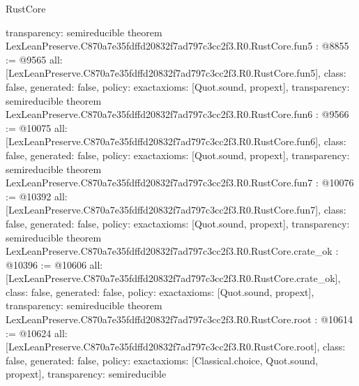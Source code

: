 \begin{lexlean}{RustCore}
\begin{coremodule}
{  transparency: semireducible
}
theorem LexLeanPreserve.C870a7e35fdffd20832f7ad797c3cc2f3.R0.RustCore.fun5 : @8855 := @9565 {
  all: [LexLeanPreserve.C870a7e35fdffd20832f7ad797c3cc2f3.R0.RustCore.fun5],
  class: false,
  generated: false,
  policy: exact{axioms: [Quot.sound, propext]},
  transparency: semireducible
}
theorem LexLeanPreserve.C870a7e35fdffd20832f7ad797c3cc2f3.R0.RustCore.fun6 : @9566 := @10075 {
  all: [LexLeanPreserve.C870a7e35fdffd20832f7ad797c3cc2f3.R0.RustCore.fun6],
  class: false,
  generated: false,
  policy: exact{axioms: [Quot.sound, propext]},
  transparency: semireducible
}
theorem LexLeanPreserve.C870a7e35fdffd20832f7ad797c3cc2f3.R0.RustCore.fun7 : @10076 := @10392 {
  all: [LexLeanPreserve.C870a7e35fdffd20832f7ad797c3cc2f3.R0.RustCore.fun7],
  class: false,
  generated: false,
  policy: exact{axioms: [Quot.sound, propext]},
  transparency: semireducible
}
theorem LexLeanPreserve.C870a7e35fdffd20832f7ad797c3cc2f3.R0.RustCore.crate_ok : @10396 := @10606 {
  all: [LexLeanPreserve.C870a7e35fdffd20832f7ad797c3cc2f3.R0.RustCore.crate_ok],
  class: false,
  generated: false,
  policy: exact{axioms: [Quot.sound, propext]},
  transparency: semireducible
}
theorem LexLeanPreserve.C870a7e35fdffd20832f7ad797c3cc2f3.R0.RustCore.root : @10614 := @10624 {
  all: [LexLeanPreserve.C870a7e35fdffd20832f7ad797c3cc2f3.R0.RustCore.root],
  class: false,
  generated: false,
  policy: exact{axioms: [Classical.choice, Quot.sound, propext]},
  transparency: semireducible
}


\end{coremodule}
\end{lexlean}
